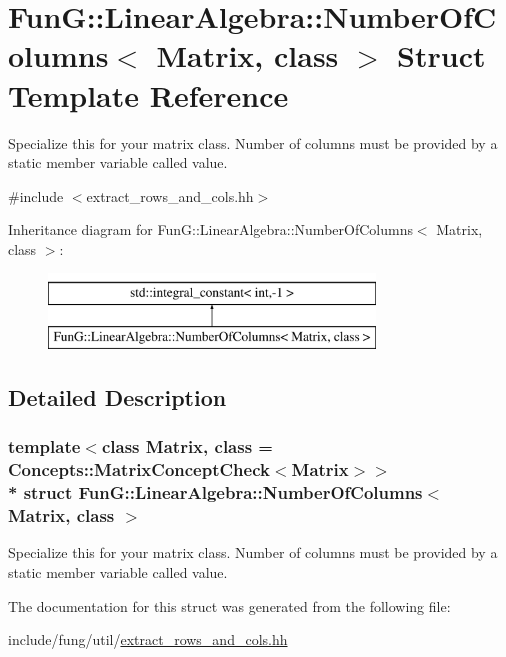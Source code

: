 \hypertarget{structFunG_1_1LinearAlgebra_1_1NumberOfColumns}{}\section{FunG\+:\+:Linear\+Algebra\+:\+:Number\+Of\+Columns$<$ Matrix, class $>$ Struct Template Reference}
\label{structFunG_1_1LinearAlgebra_1_1NumberOfColumns}


Specialize this for your matrix class. Number of columns must be provided by a static member variable called value.  




{\ttfamily \#include $<$extract\+\_\+rows\+\_\+and\+\_\+cols.\+hh$>$}

Inheritance diagram for FunG\+:\+:Linear\+Algebra\+:\+:Number\+Of\+Columns$<$ Matrix, class $>$\+:\begin{figure}[H]
\begin{center}
\leavevmode
\includegraphics[height=2.000000cm]{structFunG_1_1LinearAlgebra_1_1NumberOfColumns}
\end{center}
\end{figure}


\subsection{Detailed Description}
\subsubsection*{template$<$class Matrix, class = Concepts\+::\+Matrix\+Concept\+Check$<$\+Matrix$>$$>$\\*
struct Fun\+G\+::\+Linear\+Algebra\+::\+Number\+Of\+Columns$<$ Matrix, class $>$}

Specialize this for your matrix class. Number of columns must be provided by a static member variable called value. 

The documentation for this struct was generated from the following file\+:\begin{DoxyCompactItemize}
\item 
include/fung/util/\hyperlink{extract__rows__and__cols_8hh}{extract\+\_\+rows\+\_\+and\+\_\+cols.\+hh}\end{DoxyCompactItemize}
